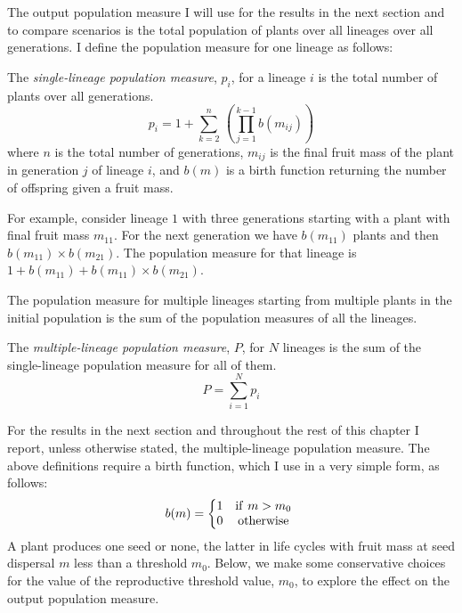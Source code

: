 The output population measure I will use for the results in the next section and
to compare scenarios is the total population of plants over all lineages over
all generations. I define the population measure for one lineage as follows:
\begin{definition}
  The \emph{single-lineage population measure}, $p_i$, for a lineage $i$ is the
  total number of plants over all generations.
\begin{equation*}
p_i = 1 + \sum_{k=2}^{n} \, (\prod_{j=1}^{k-1} b(m_{ij}))
\end{equation*}
where $n$ is the total number of generations, $m_{ij}$ is the final fruit mass
of the plant in generation $j$ of lineage $i$, and $b(m)$ is a birth function
returning the number of offspring given a fruit mass.
\end{definition}
For example, consider lineage $1$ with three generations starting
with a plant with final fruit mass \(m_{11}\). For the next generation we have
\(b(m_{11})\) plants and then \(b(m_{11}) \times b(m_{21})\). The population measure
for that lineage is \(1 + b(m_{11}) + b(m_{11}) \times b(m_{21})\).

The population measure for multiple lineages starting from multiple plants in
the initial population is the sum of the population measures of all the
lineages.
\begin{definition}
  The \emph{multiple-lineage population measure}, $P$, for $N$ lineages is the
  sum of the single-lineage population measure for all of them.
  $$
    P = \sum_{i=1}^{N} p_i
  $$
\end{definition}

For the results in the next section and throughout the rest of this chapter I
report, unless otherwise stated, the multiple-lineage population measure.  The
above definitions require a birth function, which I use in a very simple form,
as follows:
\[b( m ) = \left\{ \begin{matrix}
1 & \mathrm{if\ }m > m_{0} \\
0 & \mathrm{otherwise} \\
\end{matrix} \right.\ \] A plant produces one seed or none, the latter in life
cycles with fruit mass at seed dispersal $m$ less than a threshold
\(m_{0}\). Below, we make some conservative choices for the value of the
reproductive threshold value, \(m_{0}\), to explore the effect on the output
population measure.


